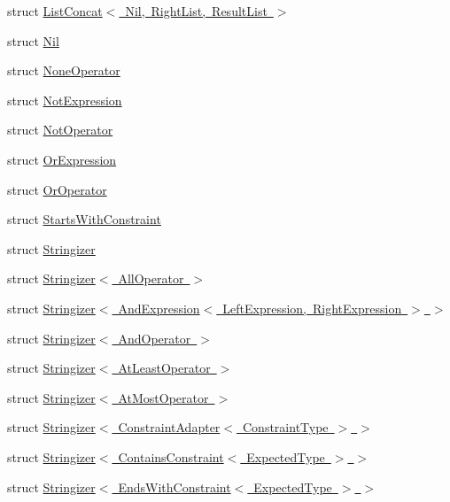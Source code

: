 \begin{DoxyCompactItemize}
\item 
struct \mbox{\hyperlink{structsnowhouse_1_1ListConcat_3_01Nil_00_01RightList_00_01ResultList_01_4}{List\+Concat$<$ Nil, Right\+List, Result\+List $>$}}
\item 
struct \mbox{\hyperlink{structsnowhouse_1_1Nil}{Nil}}
\item 
struct \mbox{\hyperlink{structsnowhouse_1_1NoneOperator}{None\+Operator}}
\item 
struct \mbox{\hyperlink{structsnowhouse_1_1NotExpression}{Not\+Expression}}
\item 
struct \mbox{\hyperlink{structsnowhouse_1_1NotOperator}{Not\+Operator}}
\item 
struct \mbox{\hyperlink{structsnowhouse_1_1OrExpression}{Or\+Expression}}
\item 
struct \mbox{\hyperlink{structsnowhouse_1_1OrOperator}{Or\+Operator}}
\item 
struct \mbox{\hyperlink{structsnowhouse_1_1StartsWithConstraint}{Starts\+With\+Constraint}}
\item 
struct \mbox{\hyperlink{structsnowhouse_1_1Stringizer}{Stringizer}}
\item 
struct \mbox{\hyperlink{structsnowhouse_1_1Stringizer_3_01AllOperator_01_4}{Stringizer$<$ All\+Operator $>$}}
\item 
struct \mbox{\hyperlink{structsnowhouse_1_1Stringizer_3_01AndExpression_3_01LeftExpression_00_01RightExpression_01_4_01_4}{Stringizer$<$ And\+Expression$<$ Left\+Expression, Right\+Expression $>$ $>$}}
\item 
struct \mbox{\hyperlink{structsnowhouse_1_1Stringizer_3_01AndOperator_01_4}{Stringizer$<$ And\+Operator $>$}}
\item 
struct \mbox{\hyperlink{structsnowhouse_1_1Stringizer_3_01AtLeastOperator_01_4}{Stringizer$<$ At\+Least\+Operator $>$}}
\item 
struct \mbox{\hyperlink{structsnowhouse_1_1Stringizer_3_01AtMostOperator_01_4}{Stringizer$<$ At\+Most\+Operator $>$}}
\item 
struct \mbox{\hyperlink{structsnowhouse_1_1Stringizer_3_01ConstraintAdapter_3_01ConstraintType_01_4_01_4}{Stringizer$<$ Constraint\+Adapter$<$ Constraint\+Type $>$ $>$}}
\item 
struct \mbox{\hyperlink{structsnowhouse_1_1Stringizer_3_01ContainsConstraint_3_01ExpectedType_01_4_01_4}{Stringizer$<$ Contains\+Constraint$<$ Expected\+Type $>$ $>$}}
\item 
struct \mbox{\hyperlink{structsnowhouse_1_1Stringizer_3_01EndsWithConstraint_3_01ExpectedType_01_4_01_4}{Stringizer$<$ Ends\+With\+Constraint$<$ Expected\+Type $>$ $>$}}

\end{DoxyCompactItemize}
